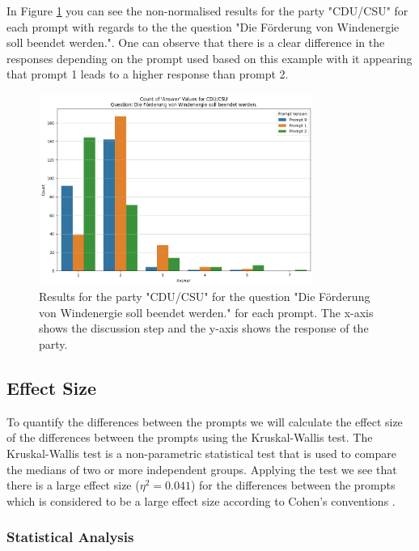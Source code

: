 \documentclass[12pt]{article}
\begin{document}
In Figure \ref{fig:cdu_results} you can see the non-normalised results for the party "CDU/CSU" for each prompt with regards to the the question "Die Förderung von Windenergie soll beendet werden.". One can observe that there is a clear difference in the responses depending on the prompt used based on this example with it appearing that prompt 1 leads to a higher response than prompt 2.

\begin{figure}[h!]
\centering
\includegraphics[width=0.8\textwidth]{img/cdu_results.png}
\caption{Results for the party "CDU/CSU" for the question "Die Förderung von Windenergie soll beendet werden." for each prompt. The x-axis shows the discussion step and the y-axis shows the response of the party.}
\label{fig:cdu_results}
\end{figure}

\subsection{Effect Size}
To quantify the differences between the prompts we will calculate the effect size of the differences between the prompts using the Kruskal-Wallis test. The Kruskal-Wallis test is a non-parametric statistical test that is used to compare the medians of two or more independent groups. Applying the test we see that there is a large effect size ($\eta^2 = 0.041$) for the differences between the prompts which is considered to be a large effect size according to Cohen's conventions \cite{cohen2013statistical}.




\subsubsection{Statistical Analysis}
\end{document}
